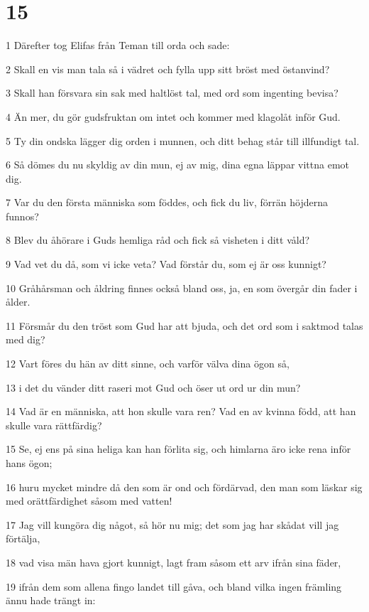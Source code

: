 \chapter{15}

\par 1 Därefter tog Elifas från Teman till orda och sade:
\par 2 Skall en vis man tala så i vädret och fylla upp sitt bröst med östanvind?
\par 3 Skall han försvara sin sak med haltlöst tal, med ord som ingenting bevisa?
\par 4 Än mer, du gör gudsfruktan om intet och kommer med klagolåt inför Gud.
\par 5 Ty din ondska lägger dig orden i munnen, och ditt behag står till illfundigt tal.
\par 6 Så dömes du nu skyldig av din mun, ej av mig, dina egna läppar vittna emot dig.
\par 7 Var du den första människa som föddes, och fick du liv, förrän höjderna funnos?
\par 8 Blev du åhörare i Guds hemliga råd och fick så visheten i ditt våld?
\par 9 Vad vet du då, som vi icke veta? Vad förstår du, som ej är oss kunnigt?
\par 10 Gråhårsman och åldring finnes också bland oss, ja, en som övergår din fader i ålder.
\par 11 Försmår du den tröst som Gud har att bjuda, och det ord som i saktmod talas med dig?
\par 12 Vart föres du hän av ditt sinne, och varför välva dina ögon så,
\par 13 i det du vänder ditt raseri mot Gud och öser ut ord ur din mun?
\par 14 Vad är en människa, att hon skulle vara ren? Vad en av kvinna född, att han skulle vara rättfärdig?
\par 15 Se, ej ens på sina heliga kan han förlita sig, och himlarna äro icke rena inför hans ögon;
\par 16 huru mycket mindre då den som är ond och fördärvad, den man som läskar sig med orättfärdighet såsom med vatten!
\par 17 Jag vill kungöra dig något, så hör nu mig; det som jag har skådat vill jag förtälja,
\par 18 vad visa män hava gjort kunnigt, lagt fram såsom ett arv ifrån sina fäder,
\par 19 ifrån dem som allena fingo landet till gåva, och bland vilka ingen främling ännu hade trängt in:
